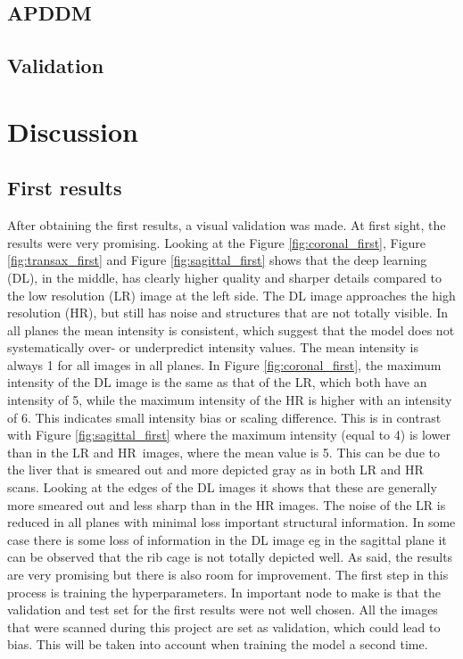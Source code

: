\documentclass[twocolumn]{article}
\begin{document}
\subsection{APDDM}

\subsection{Validation}

\section{Discussion}
\subsection{First results}
After obtaining the first results, a visual validation was made. At first sight, the results were very promising. 
Looking at the Figure \ref{fig:coronal_first}, Figure \ref{fig:transax_first} and Figure \ref{fig:sagittal_first} shows that the deep learning (DL), in the middle, has clearly higher quality and sharper details compared to the low resolution (LR) image at the left side. 
The DL image approaches the high resolution (HR), but still has noise and structures that are not totally visible. 
In all planes the mean intensity is consistent, which suggest that the model does not systematically over- or underpredict intensity values. 
The mean intensity is always 1 for all images in all planes.
In Figure \ref{fig:coronal_first}, the maximum intensity of the DL image is the same as that of the LR, which both have an intensity of 5, while the maximum intensity of the HR is higher with an intensity of 6. 
This indicates small intensity bias or scaling difference. 
This is in contrast with Figure \ref{fig:sagittal_first} where the maximum intensity (equal to 4) is lower than in the LR and HR images, where the mean value is 5. 
This can be due to the liver that is smeared out and more depicted gray as in both LR and HR scans.
Looking at the edges of the DL images it shows that these are generally more smeared out and less sharp than in the HR images. 
The noise of the LR is reduced in all planes with minimal loss important structural information. 
In some case there is some loss of information in the DL image eg in the sagittal plane it can be observed that the rib cage is not totally depicted well.
As said, the results are very promising but there is also room for improvement. The first step in this process is training the hyperparameters. 
In important node to make is that the validation and test set for the first results were not well chosen. 
All the images that were scanned during this project are set as validation, which could lead to bias. 
This will be taken into account when training the model a second time.
\end{document}

